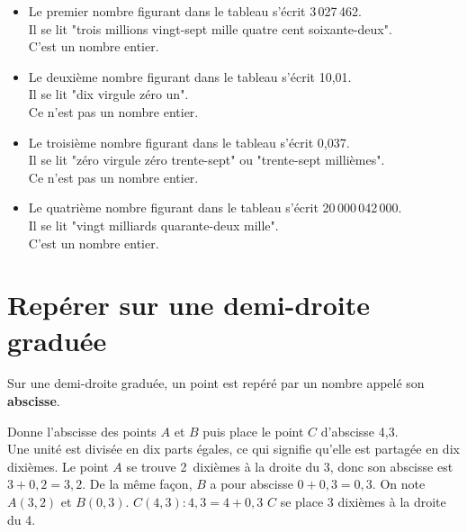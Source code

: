 \begin{exemple*1}
\begin{itemize}
 \item Le premier nombre figurant dans le tableau s'écrit 3\,027\,462.\\
Il se lit "trois millions vingt-sept mille quatre cent soixante-deux".\\
C'est un nombre entier.\\
 \item Le  deuxième nombre figurant dans le tableau s’écrit 10,01.\\
Il se lit "dix virgule zéro un".\\
Ce n’est pas un nombre entier.\\
 \item Le troisième nombre figurant dans le tableau s’écrit 0,037.\\
Il se lit "zéro virgule zéro trente-sept" ou "trente-sept millièmes".\\
Ce n’est pas un nombre entier.\\
 \item Le quatrième nombre figurant dans le tableau s’écrit 20\,000\,042\,000.\\
Il se lit "vingt milliards quarante-deux mille".\\
C’est un nombre entier.\\
 \end{itemize}
\end{exemple*1}


\section{Repérer sur une demi-droite graduée}

\begin{aconnaitre}
Sur une demi-droite graduée, un point est repéré par un nombre appelé son \textbf{abscisse}.
\end{aconnaitre}

\begin{exemple*1}
Donne l'abscisse des points $A$ et $B$
puis place le point $C$ d'abscisse 4,3.\\[1em]
Une unité est divisée en dix parts égales, ce qui signifie qu'elle est partagée en dix dixièmes. Le point $A$ se trouve 2 dixièmes à la droite du 3, donc son abscisse est $3 + 0,2 = 3,2$. De la même façon, $B$ a pour abscisse $0 + 0,3 = 0,3$. 
On note $A(3,2)$ et $B(0,3)$.
$C(4,3) : 4,3 = 4 + 0,3$
$C$ se place 3 dixièmes à la droite du 4.
\end{exemple*1}

